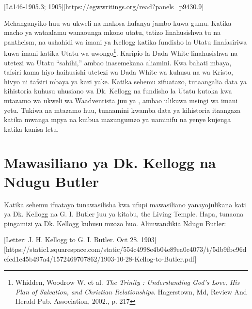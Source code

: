 [Lt146-1905.3; 1905][https://egwwritings.org/read?panels=p9430.9]


Mchanganyiko huu wa ukweli na makosa hufanya jambo kuwa gumu. Katika macho ya wataalamu wanaounga mkono utatu, tatizo linahusishwa tu na pantheism, na ushahidi wa imani ya Kellogg katika fundisho la Utatu linafasiriwa kuwa imani katika Utatu wa uwongo\footnote{Whidden, Woodrow W, et al. \textit{The Trinity : Understanding God's Love, His Plan of Salvation, and Christian Relationships}. Hagerstown, Md, Review And Herald Pub. Association, 2002., p. 217}. Karipio la Dada White linahusishwa na utetezi wa Utatu “sahihi,” ambao inasemekana aliamini. Kwa bahati mbaya, tafsiri kama hiyo haihusishi utetezi wa Dada White wa  kuhusu  na wa Kristo, hivyo ni tafsiri mbaya ya kazi yake. Katika sehemu zifuatazo, tutaangalia data ya kihistoria kuhusu uhusiano wa Dk. Kellogg na fundisho la Utatu kutoka kwa mtazamo wa ukweli wa Waadventista juu ya , ambao ulikuwa msingi wa imani yetu. Tukiwa na mtazamo huu, tunaamini kwamba data ya kihistoria itaangaza katika mwanga mpya na kuibua mazungumzo ya uaminifu na yenye kujenga katika kanisa letu.



\section*{Mawasiliano ya Dk. Kellogg na Ndugu Butler}


Katika sehemu ifuatayo tunawasilisha kwa ufupi mawasiliano yanayojulikana kati ya Dk. Kellogg na G. I. Butler juu ya kitabu, the Living Temple. Hapa, tunaona pingamizi ya Dk. Kellogg kuhusu mzozo huo. Alimwandikia Ndugu Butler:


[Letter: J. H. Kellogg to G. I. Butler. Oct 28. 1903][https://static1.squarespace.com/static/554c4998e4b04e89ea0c4073/t/5db9fbc96defed1e45b497a4/1572469707862/1903-10-28-Kellog-to-Butler.pdf]


